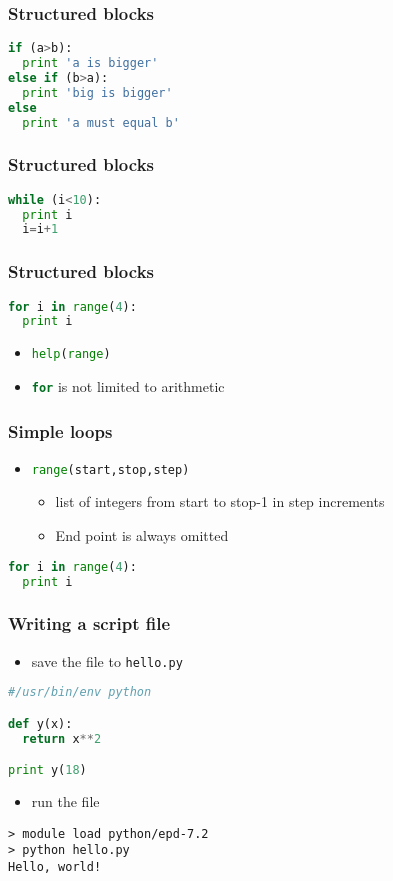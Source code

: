 \documentclass[xcolor=table,10pt,final]{beamer}
\begin{document}
\begin{frame}[fragile]
  \frametitle{Structured blocks}
  \begin{lstlisting}[language=Python]
if (a>b):
  print 'a is bigger'
else if (b>a):
  print 'big is bigger'
else
  print 'a must equal b'
\end{lstlisting}
\end{frame}

\begin{frame}[fragile]
  \frametitle{Structured blocks}
  \begin{lstlisting}[language=Python]
while (i<10):
  print i
  i=i+1
\end{lstlisting}
\end{frame}

\begin{frame}[fragile]
  \frametitle{Structured blocks}
  \begin{lstlisting}[language=Python]
for i in range(4):
  print i
\end{lstlisting}
\begin{itemize}
  \item<1-> \lstinline[language=Python]|help(range)|
  \item<2-> \lstinline[language=Python]|for| is not limited to arithmetic
\end{itemize}
\end{frame}

\begin{frame}[fragile]
  \frametitle{Simple loops}
  \begin{itemize}
    \item \lstinline[language=Python]|range(start,stop,step)|
      \begin{itemize}
        \item list of integers from start to stop-1 in step increments
        \item End point is always omitted
      \end{itemize}
  \end{itemize}
\begin{lstlisting}[language=Python]
for i in range(4):
  print i
\end{lstlisting}
\end{frame}

\begin{frame}[fragile]
  \frametitle{Writing a script file}
  \begin{itemize}
    \item save the file to {\tt hello.py}
  \end{itemize}
\begin{lstlisting}[language=Python]
#/usr/bin/env python

def y(x):
  return x**2

print y(18)
\end{lstlisting}
\begin{itemize}
  \item run the file
\end{itemize}
\begin{verbatim}
> module load python/epd-7.2
> python hello.py
Hello, world!
\end{verbatim}
\end{frame}
\end{document}

